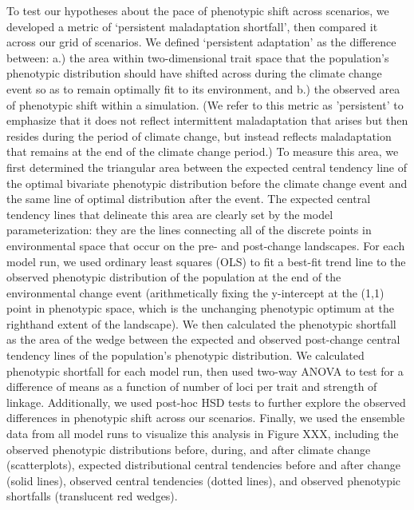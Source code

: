 \documentclass[9pt,twocolumn,twoside,lineno]{pnas-new}
\begin{document}
{To test our hypotheses about the pace of phenotypic shift across scenarios, we 
developed a metric of ‘persistent maladaptation shortfall’, then compared it across our grid of 
scenarios. We defined ‘persistent adaptation’ as the difference between: a.) the area 
within two-dimensional trait space that the population’s phenotypic distribution 
should have shifted across during the climate change event so as to remain 
optimally fit to its environment, and b.) the observed area of phenotypic shift within
a simulation. (We refer to this metric as 'persistent' to emphasize that it does
not reflect intermittent maladaptation that arises but then resides during the period of climate
change, but instead reflects maladaptation that remains at the end of the
climate change period.) To measure this area, we first determined the triangular area between 
the expected central tendency line of the optimal bivariate phenotypic distribution 
before the climate change event and the same line of optimal distribution after 
the event. The expected central tendency lines that delineate this area are clearly 
set by the model parameterization: they are the lines connecting all of the discrete 
points in environmental space that occur on the pre- and post-change landscapes. For 
each model run, we used ordinary least squares (OLS) to fit a best-fit trend line to 
the observed phenotypic distribution of the population at the end of the environmental
change event (arithmetically fixing the y-intercept at the (1,1) point in phenotypic 
space, which is the unchanging phenotypic optimum at the righthand extent of the 
landscape). We then calculated the phenotypic shortfall as the area of the wedge 
between the expected and observed post-change central tendency lines of the 
population’s phenotypic distribution. We calculated phenotypic shortfall for each 
model run, then used two-way ANOVA to test for a difference of means as a function of 
number of loci per trait and strength of linkage. Additionally, we used post-hoc HSD 
tests to further explore the observed differences in phenotypic shift across our 
scenarios. Finally, we used the ensemble data from all model runs to visualize this 
analysis in Figure XXX, including the observed phenotypic distributions before, 
during, and after climate change (scatterplots), expected distributional central
tendencies before and after change (solid lines), observed central tendencies (dotted 
lines), and observed phenotypic shortfalls (translucent red wedges).

}
\end{document}
